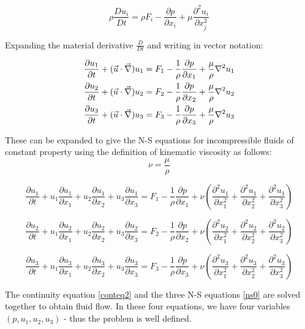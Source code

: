 \begin{equation}
\label{nsa}
\rho \frac{Du_i}{Dt} = \rho F_i -  \frac{\partial p}{\partial x_i} +  
\mu \frac{\partial^2 u_i}{\partial x_j^2} 
\end{equation} 

Expanding the material derivative $\frac{D}{Dt}$ and writing in vector notation:

\begin{eqnarray}
\label{nsan}
\frac{\partial u_1}{\partial t} + (\vec{u}\cdot\vec{\nabla})u_1 = F_1 -  \frac{1}{\rho} \frac{\partial p}{\partial x_1} +  \frac{\mu}{\rho} \nabla^2 u_1 
\nonumber \\
\frac{\partial u_2}{\partial t} + (\vec{u}\cdot\vec{\nabla})u_2 = F_2 -  \frac{1}{\rho} \frac{\partial p}{\partial x_2} +  \frac{\mu}{\rho} \nabla^2 u_2 
\nonumber \\
\frac{\partial u_3}{\partial t} + (\vec{u}\cdot\vec{\nabla})u_3 = F_3 -  \frac{1}{\rho} \frac{\partial p}{\partial x_3} +  \frac{\mu}{\rho} \nabla^2 u_3 
\end{eqnarray} 

These can be expanded to give the N-S equations for incompressible fluids of constant property using the definition of kinematic viscosity as follows:
$$\nu = \frac{\mu}{\rho}$$

\begin{equation}
\label{nsa1}
\boxed{
\frac{\partial u_1}{\partial t} + u_1\frac{\partial u_1}{\partial x_1} + u_2\frac{\partial u_1}{\partial x_2} + u_3\frac{\partial u_1}{\partial x_3} = F_1 -  \frac{1}{\rho}\frac{\partial p}{\partial x_1} + \nu \left( \frac{\partial^2 u_1}{\partial x_1^2} + \frac{\partial^2 u_1}{\partial x_2^2} + \frac{\partial^2 u_1}{\partial x_3^2} \right)
}
\end{equation} 

\begin{equation}
\label{nsa2}
\boxed{
\frac{\partial u_2}{\partial t} + u_1\frac{\partial u_2}{\partial x_1} + u_2\frac{\partial u_2}{\partial x_2} + u_3\frac{\partial u_2}{\partial x_3} = F_2 -  \frac{1}{\rho}\frac{\partial p}{\partial x_2} + \nu \left( \frac{\partial^2 u_2}{\partial x_1^2} + \frac{\partial^2 u_2}{\partial x_2^2} + \frac{\partial^2 u_2}{\partial x_3^2} \right)
}
\end{equation} 

\begin{equation}
\label{nsa3}
\boxed{
\frac{\partial u_3}{\partial t} + u_1\frac{\partial u_3}{\partial x_1} + u_2\frac{\partial u_3}{\partial x_2} + u_3\frac{\partial u_3}{\partial x_3} = F_3 -  \frac{1}{\rho}\frac{\partial p}{\partial x_3} + \nu \left( \frac{\partial^2 u_3}{\partial x_1^2} + \frac{\partial^2 u_3}{\partial x_2^2} + \frac{\partial^2 u_3}{\partial x_3^2} \right)
}
\end{equation} 

The continuity equation \ref{conteq2} and the three N-S equations \ref{ns0} are solved together to obtain fluid flow. In these four equations, we have four variables $(p, u_1, u_2, u_3)$ - thus the problem is well defined.

